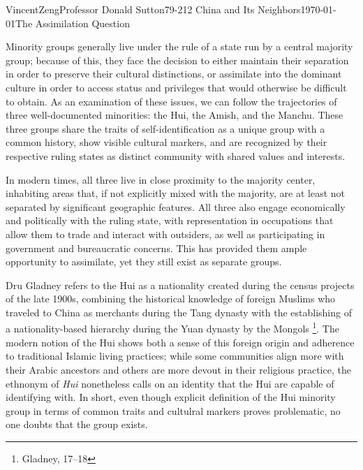 \documentclass{article}[12pt]
\begin{document}
\begin{mla}{Vincent}{Zeng}{Professor Donald Sutton}{79-212 China and Its Neighbors}{\today}{The Assimilation Question}

Minority groups generally live under the rule of a state run by a central
majority group; because of this, they face the decision to either maintain their
separation in order to preserve their cultural distinctions, or assimilate into
the dominant culture in order to access status and privileges that would
otherwise be difficult to obtain. As an examination of these issues, we can
follow the trajectories of three well-documented minorities: the Hui, the
Amish, and the Manchu. These three groups share the traits of
self-identification as a unique group with a common history, show visible
cultural markers, and are
recognized by their respective ruling states as distinct community with shared
values and interests. 

In modern times, all three live in close proximity to the
majority center, inhabiting areas that, if not explicitly mixed with the
majority, are at least not separated by significant geographic features. All
three also engage economically and politically with the ruling state, with
representation in occupations that allow them to trade and interact with
outsiders, as well as participating in government and bureaucratic concerns.
This has provided them ample opportunity to assimilate, yet they still exist as
separate groups.

Dru Gladney refers to the Hui as a nationality created during the census
projects of the late 1900s, combining the historical knowledge of foreign
Muslims who traveled to China as merchants during the Tang dynasty with the
establishing of a nationality-based hierarchy during the Yuan dynasty by the Mongols
\footnote{Gladney, 17--18}. The modern notion of the Hui shows both a sense of
this foreign origin and adherence to traditional Islamic living practices; while some
communities align more with their Arabic ancestors and others are more devout
in their religious practice, the ethnonym of \textit{Hui} nonetheless calls on
an identity that the Hui are capable of identifying with. In short, even though
explicit definition of the Hui minority group in terms of common traits and
cultulral markers proves problematic, no one doubts that the group exists.


\end{mla}
\end{document}
